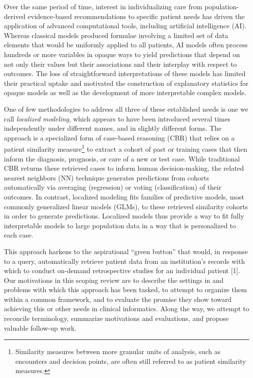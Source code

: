 \documentclass[preprint, 3p,
authoryear]{elsarticle} %
\begin{document}
Over the same period of time, interest in individualizing care from
population-derived evidence-based recommendations to specific patient
needs has driven the application of advanced computational tools,
including artificial intelligence (AI). Whereas classical models
produced formulae involving a limited set of data elements that would be
uniformly applied to all patients, AI models often process hundreds or
more variables in opaque ways to yield predictions that depend on not
only their values but their associations and their interplay with
respect to outcomes. The loss of straightforward interpretations of
these models has limited their practical uptake and motivated the
construction of explanatory statistics for opaque models as well as the
development of more interpretable complex models.

One of few methodologies to address all three of these established needs
is one we call \emph{localized modeling}, which appears to have been
introduced several times independently under different names, and in
slightly different forms. The approach is a specialized form of
case-based reasoning (CBR) that relies on a patient similarity
measure\footnote{Similarity measures between more granular units of
  analysis, such as encounters and decision points, are often still
  referred to as patient similarity measures.} to extract a cohort of
past or training cases that then inform the diagnosis, prognosis, or
care of a new or test case. While traditional CBR returns these
retrieved cases to inform human decision-making, the related nearest
neighbors (NN) technique generates predictions from cohorts
automatically via averaging (regression) or voting (classification) of
their outcomes. In contrast, localized modeling fits families of
predictive models, most commonly generalized linear models (GLMs), to
these retrieved similarity cohorts in order to generate predictions.
Localized models thus provide a way to fit fully interpretable models to
large population data in a way that is personalized to each case.

This approach harkens to the aspirational ``green button'' that would,
in response to a query, automatically retrieve patient data from an
institution's records with which to conduct on-demand retrospective
studies for an individual patient {[}1{]}. Our motivations in this
scoping review are to describe the settings in and problems with which
this approach has been tasked, to attempt to organize them within a
common framework, and to evaluate the promise they show toward achieving
this or other needs in clinical informatics. Along the way, we attempt
to reconcile terminology, summarize motivations and evaluations, and
propose valuable follow-up work.
\end{document}
